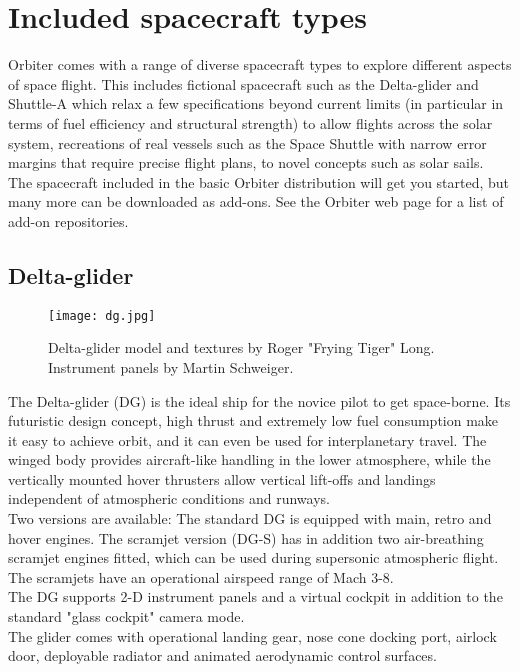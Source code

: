 \documentclass[Orbiter User Manual.tex]{subfiles}
\begin{document}
\section{Included spacecraft types}
Orbiter comes with a range of diverse spacecraft types to explore different aspects of space flight. This includes fictional spacecraft such as the Delta-glider and Shuttle-A which relax a few specifications beyond current limits (in particular in terms of fuel efficiency and structural strength) to allow flights across the solar system, recreations of real vessels such as the Space Shuttle with narrow error margins that require precise flight plans, to novel concepts such as solar sails.\\
The spacecraft included in the basic Orbiter distribution will get you started, but many more can be downloaded as add-ons. See the Orbiter web page for a list of add-on repositories.


\subsection{Delta-glider}
\label{ssec:delta_glider}

\begin{figure}[H]
  \centering
  \texttt{[image: dg.jpg]}
  \caption{Delta-glider model and textures by Roger "Frying Tiger" Long. Instrument panels by Martin Schweiger.}
\end{figure}

\noindent
The Delta-glider (DG) is the ideal ship for the novice pilot to get space-borne. Its futuristic design concept, high thrust and extremely low fuel consumption make it easy to achieve orbit, and it can even be used for interplanetary travel. The winged body provides aircraft-like handling in the lower atmosphere, while the vertically mounted hover thrusters allow vertical lift-offs and landings independent of atmospheric conditions and runways.\\
Two versions are available: The standard DG is equipped with main, retro and hover engines. The scramjet version (DG-S) has in addition two air-breathing scramjet engines fitted, which can be used during supersonic atmospheric flight. The scramjets have an operational airspeed range of Mach 3-8.\\
The DG supports 2-D instrument panels and a virtual cockpit in addition to the standard "glass cockpit" camera mode.\\
The glider comes with operational landing gear, nose cone docking port, airlock door, deployable radiator and animated aerodynamic control surfaces.
\end{document}
